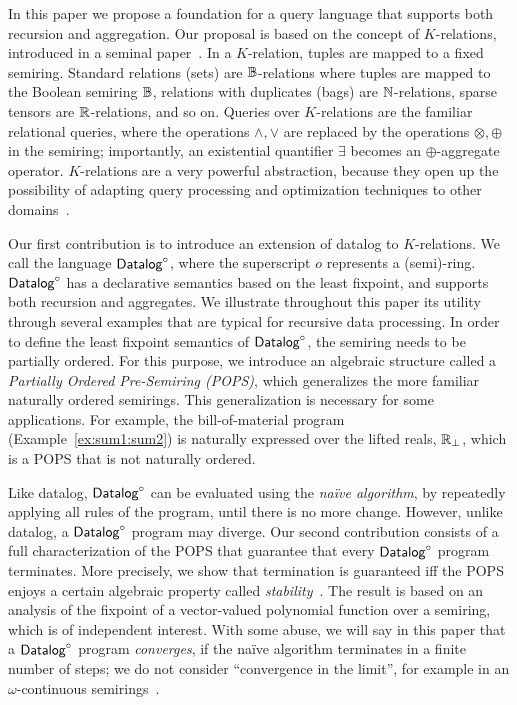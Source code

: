 In this paper we propose a foundation for a query language that
supports both recursion and aggregation.  Our proposal is based on the
concept of $K$-relations, introduced in a seminal
paper~\cite{DBLP:conf/pods/GreenKT07}.  In a $K$-relation, tuples are
mapped to a fixed semiring. Standard relations (sets) are
$\mathbb B$-relations where tuples are mapped to the Boolean semiring $\mathbb B$,
relations with duplicates (bags) are $\mathbb N$-relations, sparse tensors
are $\mathbb R$-relations, and so on.  Queries over $K$-relations are the
familiar relational queries, where the operations $\wedge, \vee$ are
replaced by the operations $\otimes, \oplus$ in the semiring;
importantly, an existential quantifier $\exists$ becomes an
$\oplus$-aggregate operator.
$K$-relations are a very powerful abstraction, because they open up
the possibility of adapting query processing and optimization
techniques to other domains~\cite{DBLP:conf/pods/KhamisNR16}.

Our first contribution is to introduce an extension of datalog to
$K$-relations.  We call the language $\text{\sf Datalog}^\circ$, where the superscript
$o$ represents a (semi)-ring.  $\text{\sf Datalog}^\circ$ has a declarative semantics
based on the least fixpoint, and supports both recursion and
aggregates.  We illustrate throughout this paper its utility through
several examples that are typical for recursive data processing.  In
order to define the least fixpoint semantics of $\text{\sf Datalog}^\circ$, the semiring
needs to be partially ordered.  For this purpose, we introduce an
algebraic structure called a {\em Partially Ordered Pre-Semiring (POPS)\/},
which generalizes the more familiar naturally ordered semirings.  This
generalization is necessary for some applications.  For example, the
bill-of-material program (Example~\ref{ex:sum1:sum2}) is naturally
expressed over the lifted reals, $\mathbb R_\bot$, which is a POPS that is
not naturally ordered.

Like datalog, $\text{\sf Datalog}^\circ$ can be evaluated using the {\em na\"ive algorithm},
by repeatedly applying all rules of the program, until there is no
more change.  However, unlike datalog, a $\text{\sf Datalog}^\circ$ program may diverge.
Our second contribution consists of a full characterization of the
POPS that guarantee that every $\text{\sf Datalog}^\circ$ program terminates.  More
precisely, we show that termination is guaranteed iff the POPS enjoys
a certain algebraic property called {\em
  stability}~\cite{semiring_book}.  The result is based on an analysis
of the fixpoint of a vector-valued polynomial function over a semiring, which is of
independent interest.  With some abuse, we will say in this paper that
a $\text{\sf Datalog}^\circ$ program {\em converges}, if the na\"ive algorithm terminates
in a finite number of steps; we do not consider ``convergence in the
limit'', for example in an $\omega$-continuous
semirings~\cite{DBLP:conf/pods/GreenKT07,DBLP:journals/jacm/EsparzaKL10}.

